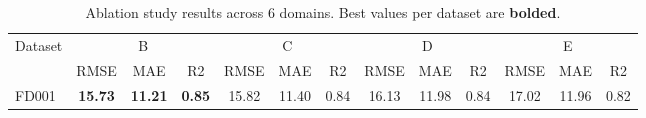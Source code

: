 \begin{table}[t]
\centering
\caption{Ablation study results across 6 domains. Best values per dataset are \textbf{bolded}.}
\label{tab:ablation}
\begin{tabular}{lccc|ccc|ccc|ccc}
\toprule
Dataset & \multicolumn{3}{c}{B} & \multicolumn{3}{c}{C} & \multicolumn{3}{c}{D} & \multicolumn{3}{c}{E} \\
 & RMSE & MAE & R2 & RMSE & MAE & R2 & RMSE & MAE & R2 & RMSE & MAE & R2 \\
\midrule
FD001 & \textbf{15.73} & \textbf{11.21} & \textbf{0.85} & 15.82 & 11.40 & 0.84 & 16.13 & 11.98 & 0.84 & 17.02 & 11.96 & 0.82 \\
\bottomrule
\end{tabular}
\end{table}
